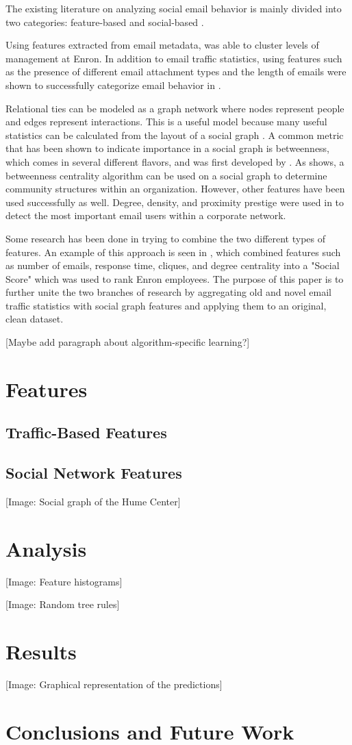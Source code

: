 \documentclass[conference]{IEEEtran}
\begin{document}
The existing literature on analyzing social email behavior is mainly divided into two categories: feature-based and social-based \cite{tang_email_2013}.  

Using features extracted from email metadata, \cite{yelupula_social_2008} was able to cluster levels of management at Enron. In addition to email traffic statistics, using features such as the presence of different email attachment types and the length of emails were shown to successfully categorize email behavior in \cite{martin_analyzing_2005}.

Relational ties can be modeled as a graph network where nodes represent people and edges represent interactions.  This is a useful model because many useful statistics can be calculated from the layout of a social graph \cite{wasserman_social_1994}.  A common metric that has been shown to indicate importance in a social graph is betweenness, which comes in several different flavors, and was first developed by \cite{freeman_set_1977}. As \cite{tyler_email_2003} shows, a betweenness centrality algorithm can be used on a social graph to determine community structures within an organization.  However, other features have been used successfully as well.  Degree, density, and proximity prestige were used in \cite{wilson_discovery_2009} to detect the most important email users within a corporate network.

Some research has been done in trying to combine the two different types of features.  An example of this approach is seen in \cite{rowe_automated_2007}, which combined features such as number of emails, response time, cliques, and degree centrality into a "Social Score" which was used to rank Enron employees.  The purpose of this paper is to further unite the two branches of research by aggregating old and novel email traffic statistics with social graph features and applying them to an original, clean dataset. 

[Maybe add paragraph about algorithm-specific learning?]


\section{Features}
\subsection{Traffic-Based Features}
\subsection{Social Network Features}
[Image: Social graph of the Hume Center]

\section{Analysis}
[Image: Feature histograms]

[Image: Random tree rules]
\section{Results}
[Image: Graphical representation of the predictions]


\section{Conclusions and Future Work}



\end{document}
